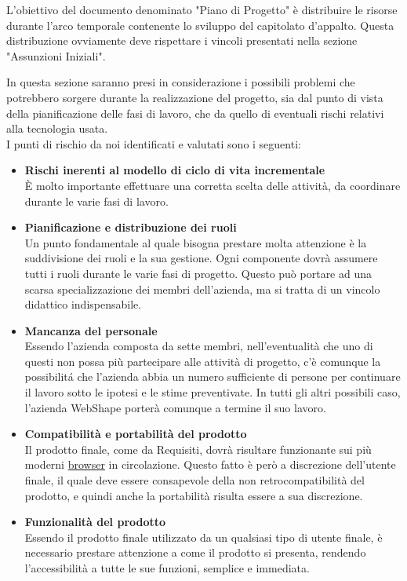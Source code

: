 L'obiettivo del documento denominato "Piano di Progetto" \`e distribuire le risorse durante l'arco temporale 
contenente lo sviluppo del capitolato d'appalto. Questa distribuzione ovviamente deve rispettare i vincoli presentati 
nella sezione "Assunzioni Iniziali".

In questa sezione saranno presi in considerazione i possibili problemi che potrebbero sorgere durante la realizzazione del progetto, sia dal punto di vista della pianificazione delle fasi di lavoro, che da quello di eventuali rischi relativi alla tecnologia usata.\\
I punti di rischio da noi identificati e valutati sono i seguenti:
\begin{itemize}
\item \textbf{Rischi inerenti al modello di ciclo di vita incrementale}\\
\`E molto importante effettuare una corretta scelta delle attivit\`a, da coordinare durante le varie fasi di lavoro.
\item \textbf{Pianificazione e distribuzione dei ruoli}\\
Un punto fondamentale al quale bisogna prestare molta attenzione \`e la suddivisione dei ruoli e la sua gestione. Ogni componente dovr\`a assumere tutti i ruoli durante le varie fasi di progetto. Questo pu\`o portare ad una scarsa specializzazione dei membri dell'azienda, ma si tratta di un vincolo didattico indispensabile.
\item \textbf{Mancanza del personale}\\
Essendo l'azienda composta da sette membri, nell'eventualit\`a che uno di questi non possa pi\`u partecipare alle attivit\`a di progetto, c'\`e comunque la possibilit\'a che l'azienda abbia un numero sufficiente di persone per continuare il lavoro sotto le ipotesi e le stime preventivate. In tutti gli altri possibili caso, l'azienda WebShape porter\`a comunque a termine il suo lavoro.
\item \textbf{Compatibilit\`a e portabilit\`a del prodotto}\\
Il prodotto finale, come da Requisiti, dovr\`a risultare funzionante sui pi\`u moderni {\underline{browser}} in circolazione. Questo fatto \`e per\`o  a discrezione dell'utente finale, il quale deve essere consapevole della non retrocompatibilit\`a del prodotto, e quindi anche la portabilit\`a risulta essere  a sua discrezione.
\item \textbf{Funzionalit\`a del prodotto}\\
Essendo il prodotto finale utilizzato da un qualsiasi tipo di utente finale, \`e necessario prestare attenzione a come il prodotto si presenta, rendendo l'accessibilit\`a a tutte le sue funzioni, semplice e immediata.
\end{itemize}			


